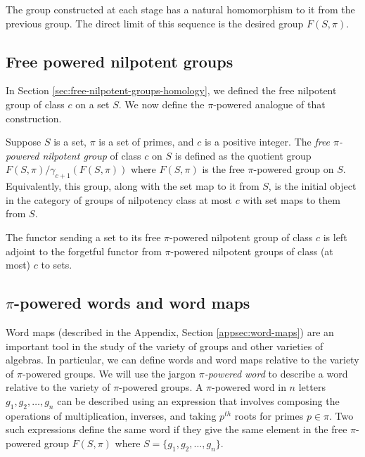 The group constructed at each stage has a natural homomorphism to it
from the previous group. The direct limit of this sequence is the
desired group $F(S,\pi)$.

\subsection{Free powered nilpotent groups}\label{sec:free-powered-nilpotent}

In Section \ref{sec:free-nilpotent-groups-homology}, we defined the free
nilpotent group of class $c$ on a set $S$. We now define the
$\pi$-powered analogue of that construction.

\begin{definer}
  Suppose $S$ is a set, $\pi$ is a set of primes, and $c$ is a
  positive integer. The {\em free $\pi$-powered nilpotent group} of
  class $c$ on $S$ is defined as the quotient group
  $F(S,\pi)/\gamma_{c+1}(F(S,\pi))$ where $F(S,\pi)$ is the free
  $\pi$-powered group on $S$. Equivalently, this group, along with the
  set map to it from $S$, is the initial object in the category of
  groups of nilpotency class at most $c$ with set maps to them from
  $S$.

  The functor sending a set to its free $\pi$-powered nilpotent group
  of class $c$ is left adjoint to the forgetful functor from
  $\pi$-powered nilpotent groups of class (at most) $c$ to sets.
\end{definer}

\subsection{$\pi$-powered words and word maps}\label{sec:pi-powered-word-maps}

Word maps (described in the Appendix, Section \ref{appsec:word-maps})
are an important tool in the study of the variety of groups and other
varieties of algebras. In particular, we can define words and word
maps relative to the variety of $\pi$-powered groups. We will use the
jargon {\em $\pi$-powered word} to describe a word relative to the
variety of $\pi$-powered groups. A $\pi$-powered word in $n$ letters
$g_1,g_2,\dots,g_n$ can be described using an expression that involves
composing the operations of multiplication, inverses, and taking
$p^{th}$ roots for primes $p \in \pi$. Two such expressions define the
same word if they give the same element in the free $\pi$-powered
group $F(S,\pi)$ where $S = \{ g_1,g_2,\dots,g_n \}$.

